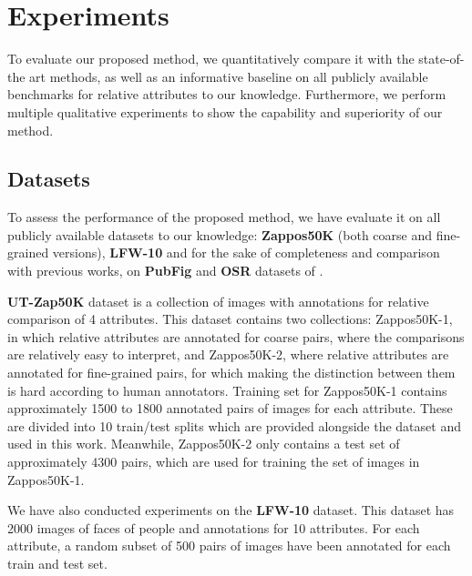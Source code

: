 

\section{Experiments}\label{sec.4}

To evaluate our proposed method, we quantitatively compare it  with the state-of-the art methods, as well as an informative baseline on all publicly available benchmarks for relative attributes to our knowledge. Furthermore, we perform multiple qualitative experiments to show the %
capability and superiority of our method.

\subsection{Datasets}\label{sec.4.1}

To assess the performance of the proposed method, we have evaluate it on all publicly available datasets to our knowledge: \textbf{Zappos50K} \cite{Yu2014} (both coarse and fine-grained versions), \textbf{LFW-10} \cite{Sandeep_2014_CVPR} and for the sake of completeness and comparison with previous works, on \textbf{PubFig} and \textbf{OSR} datasets of \cite{parikh2011}.

\textbf{UT-Zap50K} \cite{Yu2014} dataset is a collection of images with annotations for relative comparison of 4 attributes. This dataset contains two collections: Zappos50K-1, in which relative attributes are annotated for coarse pairs, where the comparisons are relatively easy to interpret, and Zappos50K-2, where relative attributes are annotated for fine-grained pairs, for which making the distinction between them is hard according to human annotators.
Training set for Zappos50K-1 contains approximately 1500 to 1800 annotated pairs of images for each attribute. These are divided into 10 train/test splits which are provided alongside the dataset and used in this work. Meanwhile, Zappos50K-2 only contains a test set of approximately 4300 pairs, which are used for training the set of images in Zappos50K-1.

We have also conducted experiments on the \textbf{LFW-10} \cite{Sandeep_2014_CVPR} dataset. This dataset has 2000 images of faces of people and annotations for 10 attributes. For each attribute, a random subset of 500 pairs of images have been annotated for each train and test set.

